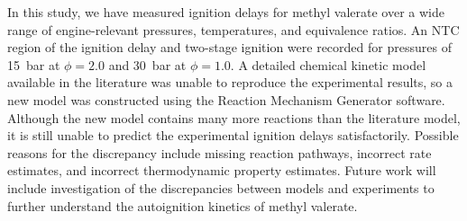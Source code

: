 \documentclass[12pt]{../ussci}
\begin{document}
In this study, we have measured ignition delays for methyl valerate over a wide
range of engine-relevant pressures, temperatures, and equivalence ratios. An NTC
region of the ignition delay and two-stage ignition were recorded for pressures
of \SI{15}{\bar} at \(\phi=2.0\) and \SI{30}{\bar} at \(\phi=1.0\). A detailed
chemical kinetic model available in the literature was unable to reproduce the
experimental results, so a new model was constructed using the Reaction
Mechanism Generator software. Although the new model contains many more
reactions than the literature model, it is still unable to predict the
experimental ignition delays satisfactorily. Possible reasons for the
discrepancy include missing reaction pathways, incorrect rate estimates, and
incorrect thermodynamic property estimates. Future work will include
investigation of the discrepancies between models and experiments to further
understand the autoignition kinetics of methyl valerate.

\printbibliography
\end{document}
